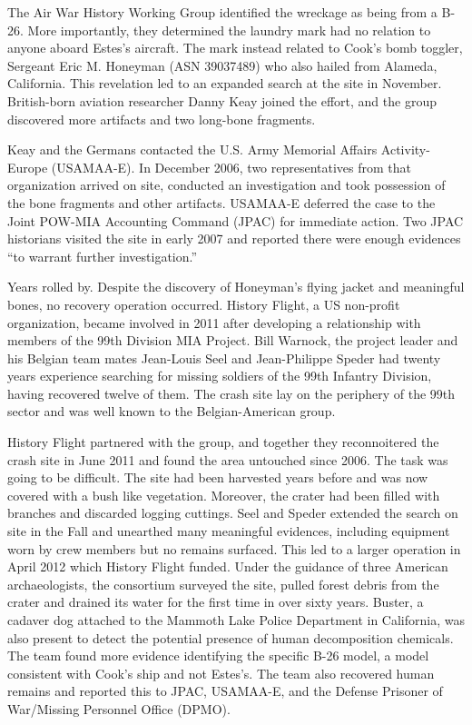 \documentclass{article}
\begin{document}
\begin{multicols}{3}
The Air War History Working Group identified the wreckage as being from a B-26. More importantly, they determined the laundry mark had no relation to anyone aboard Estes’s aircraft. The mark instead related to Cook’s bomb toggler, Sergeant Eric M. Honeyman (ASN 39037489) who also hailed from Alameda, California. This revelation led to an expanded search at the site in November. British-born aviation researcher Danny Keay joined the effort, and the group discovered more artifacts and two long-bone fragments.

Keay and the Germans contacted the U.S. Army Memorial Affairs Activity-Europe (USAMAA-E). In December 2006, two representatives from that organization arrived on site, conducted an investigation and took possession of the bone fragments and other artifacts. USAMAA-E deferred the case to the Joint POW-MIA Accounting Command (JPAC) for immediate action. Two JPAC historians visited the site in early 2007 and reported there were enough evidences “to warrant further investigation.”

Years rolled by. Despite the discovery of Honeyman’s flying jacket and meaningful bones, no recovery operation occurred. History Flight, a US non-profit organization, became involved in 2011 after developing a relationship with members of the 99th Division MIA Project. Bill Warnock, the project leader and his Belgian team mates Jean-Louis Seel and Jean-Philippe Speder had twenty years experience searching for missing soldiers of the 99th Infantry Division, having recovered twelve of them. The crash site lay on the periphery of the 99th sector and was well known to the Belgian-American group.

History Flight partnered with the group, and together they reconnoitered the crash site in June 2011 and found the area untouched since 2006. The task was going to be difficult. The site had been harvested years before and was now covered with a bush like vegetation. Moreover, the crater had been filled with branches and discarded logging cuttings. Seel and Speder extended the search on site in the Fall and unearthed many meaningful evidences, including equipment worn by crew members but no remains surfaced. This led to a larger operation in April 2012 which History Flight funded. Under the guidance of three American archaeologists, the consortium surveyed the site, pulled forest debris from the crater and drained its water for the first time in over sixty years. Buster, a cadaver dog attached to the Mammoth Lake Police Department in California, was also present to detect the potential presence of human decomposition chemicals. The team found more evidence identifying the specific B-26 model, a model consistent with Cook’s ship and not Estes’s. The team also recovered human remains and reported this to JPAC, USAMAA-E, and the Defense Prisoner of War/Missing Personnel Office (DPMO).


\end{multicols}
\end{document}
